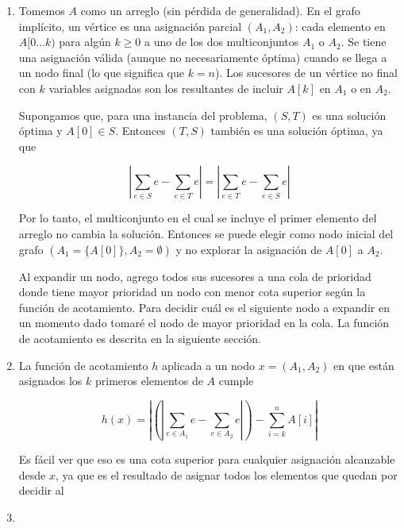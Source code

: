 \documentclass{article}
\begin{document}
\begin{enumerate}

 \item

Tomemos $A$ como un arreglo (sin pérdida de generalidad). En el grafo implícito, un vértice es
una asignación parcial $(A_1, A_2)$: cada elemento en $A[0 \ldots k)$ para algún $k \geq 0$ a uno de los dos multiconjuntos
$A_1$ o $A_2$.
Se tiene una asignación válida (aunque no necesariamente óptima) cuando se llega a un nodo final (lo que significa que $k = n$).
Los sucesores de un vértice no final con $k$ variables asignadas
son los resultantes de incluir $A[k]$ en $A_1$ o en $A_2$.

Supongamos que, para una instancia del problema, $(S, T)$ es una solución óptima
y $A[0] \in S$. Entonces $(T, S)$ también es una solución óptima, ya que

$$
\left|\sum_{e \in S} e - \sum_{e \in T} e\right| = \left|\sum_{e \in T} e - \sum_{e \in S} e\right|
$$

Por lo tanto, el multiconjunto en el cual se incluye el primer elemento del arreglo no cambia la solución.
Entonces se puede elegir como nodo inicial del grafo $(A_1 = \{A[0]\}, A_2 = \emptyset)$ y no explorar
la asignación de $A[0]$ a $A_2$.

Al expandir un nodo, agrego todos sus sucesores a una cola de prioridad donde tiene mayor prioridad un nodo
con menor cota superior según la función de acotamiento.
Para decidir cuál es el siguiente nodo a expandir en un momento dado tomaré el nodo de mayor prioridad
en la cola. La función de acotamiento es descrita en la siguiente sección.

 \item

La función de acotamiento $h$ aplicada a un nodo $x = (A_1, A_2)$ en que están asignados los $k$
primeros elementos de $A$ cumple 

$$
h(x) = \left| \left(\left|\sum_{e \in A_1} e - \sum_{e \in A_2} e\right|\right) - \sum_{i=k}^n A[i] \right|
$$

Es fácil ver que eso es una cota superior para cualquier asignación alcanzable desde $x$, ya que es el resultado
de asignar todos los elementos que quedan por decidir al 

 \item


\end{enumerate}

\section{}
\end{document}
